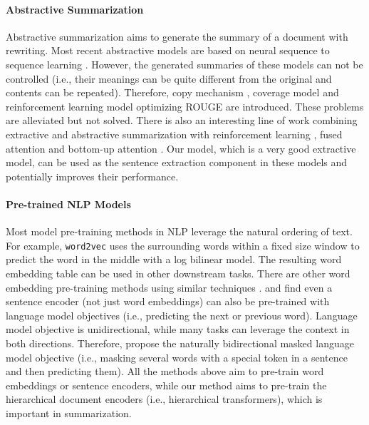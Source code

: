 \documentclass[11pt,a4paper]{article}
\begin{document}
\paragraph{Abstractive Summarization}  Abstractive summarization aims to generate the summary of a document with rewriting. Most recent abstractive models \cite{nallapati:2016:arxiv} are based on neural sequence to sequence learning \cite{bahdanau:2015:iclr,sutskever:2014:nips}. However, the generated summaries of these models can not be controlled (i.e., their meanings can be quite different from the original and contents can be repeated). Therefore, copy mechanism \cite{gu:2016:acl}, coverage model \cite{see:2017:acl} and reinforcement learning model optimizing ROUGE \cite{paulus:2017:arxiv} are introduced. These problems are alleviated but not solved. There is also an interesting line of work combining extractive and abstractive summarization with reinforcement learning \cite{chen:2018:acl}, fused attention \cite{hsu:2018:acl} and bottom-up attention \cite{gehrmann:2018:emnlp}. Our model, which is a very good extractive model, can be used as the sentence extraction component in these models and potentially improves their performance. 

\paragraph{Pre-trained NLP Models} Most model pre-training methods in NLP leverage the natural ordering of text. For example, {\tt word2vec} uses the surrounding words within a fixed size window to predict the word in the middle with a log bilinear model. The resulting word embedding table can be used in other downstream tasks. There are other word embedding pre-training methods using similar techniques \cite{pennington:2014:emnlp,bojanowski:2017:tacl}.  and  find even a sentence encoder (not just word embeddings) can also be pre-trained with language model objectives (i.e., predicting the next or previous word). Language model objective is unidirectional, while many tasks can leverage the context in both directions. Therefore,  propose the naturally bidirectional masked language model objective (i.e., masking several words with a special token in a sentence and then predicting them). All the methods above aim to pre-train word embeddings or sentence encoders, while our method aims to pre-train the hierarchical document encoders (i.e., hierarchical transformers), which is important in summarization. 
\end{document}
